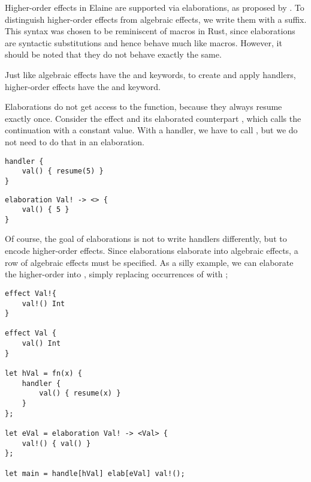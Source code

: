 Higher-order effects in Elaine are supported via elaborations, as proposed by \textcite{bach_poulsen_hefty_2023}. To distinguish higher-order effects from algebraic effects, we write them with a \el{!} suffix. This syntax was chosen to be reminiscent of macros in Rust, since elaborations are syntactic substitutions and hence behave much like macros. However, it should be noted that they do not behave exactly the same.

Just like algebraic effects have the  and  keywords, to create and apply handlers, higher-order effects have the  and  keyword.

Elaborations do not get access to the  function, because they always resume exactly once. Consider the effect  and its elaborated counterpart , which calls the continuation with a constant value. With a handler, we have to call , but we do not need to do that in an elaboration.

\begin{minipage}[b]{0.5\textwidth}
\begin{lstlisting}[language=elaine,style=fancy]
handler {
    val() { resume(5) }
}
\end{lstlisting}
\end{minipage}
\begin{minipage}[b]{0.5\textwidth}
\begin{lstlisting}[language=elaine,style=fancy]
elaboration Val! -> <> {
    val() { 5 }
}
\end{lstlisting}
\end{minipage}

Of course, the goal of elaborations is not to write handlers differently, but to encode higher-order effects. Since elaborations elaborate into algebraic effects, a row of algebraic effects must be specified. As a silly example, we can elaborate the higher-order  into , simply replacing occurrences of  with ;

\begin{lstlisting}[language=elaine,style=fancy]
effect Val!{
    val!() Int
}

effect Val {
    val() Int
}

let hVal = fn(x) { 
    handler {
        val() { resume(x) }
    }
};

let eVal = elaboration Val! -> <Val> {
    val!() { val() }
};

let main = handle[hVal] elab[eVal] val!();
\end{lstlisting}

